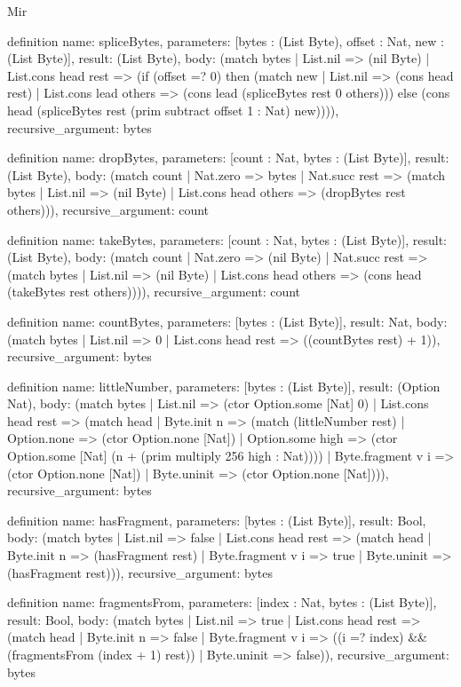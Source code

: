 \begin{lexlean}{Mir}
\begin{semanticmodule}
definition{
  name: spliceBytes,
  parameters: [bytes : (List Byte), offset : Nat, new : (List Byte)],
  result: (List Byte),
  body: (match bytes
    | List.nil => (nil Byte)
    | List.cons head rest => (if (offset =? 0) then (match new
      | List.nil => (cons head rest)
      | List.cons lead others => (cons lead (spliceBytes rest 0 others))) else (cons head (spliceBytes rest (prim subtract offset 1 : Nat) new)))),
  recursive_argument: bytes
}

definition{
  name: dropBytes,
  parameters: [count : Nat, bytes : (List Byte)],
  result: (List Byte),
  body: (match count
    | Nat.zero => bytes
    | Nat.succ rest => (match bytes
      | List.nil => (nil Byte)
      | List.cons head others => (dropBytes rest others))),
  recursive_argument: count
}

definition{
  name: takeBytes,
  parameters: [count : Nat, bytes : (List Byte)],
  result: (List Byte),
  body: (match count
    | Nat.zero => (nil Byte)
    | Nat.succ rest => (match bytes
      | List.nil => (nil Byte)
      | List.cons head others => (cons head (takeBytes rest others)))),
  recursive_argument: count
}

definition{
  name: countBytes,
  parameters: [bytes : (List Byte)],
  result: Nat,
  body: (match bytes | List.nil => 0 | List.cons head rest => ((countBytes rest) + 1)),
  recursive_argument: bytes
}

definition{
  name: littleNumber,
  parameters: [bytes : (List Byte)],
  result: (Option Nat),
  body: (match bytes
    | List.nil => (ctor Option.some [Nat] 0)
    | List.cons head rest => (match head
      | Byte.init n => (match (littleNumber rest)
        | Option.none => (ctor Option.none [Nat])
        | Option.some high => (ctor Option.some [Nat] (n + (prim multiply 256 high : Nat))))
      | Byte.fragment v i => (ctor Option.none [Nat])
      | Byte.uninit => (ctor Option.none [Nat]))),
  recursive_argument: bytes
}

definition{
  name: hasFragment,
  parameters: [bytes : (List Byte)],
  result: Bool,
  body: (match bytes
    | List.nil => false
    | List.cons head rest => (match head
      | Byte.init n => (hasFragment rest)
      | Byte.fragment v i => true
      | Byte.uninit => (hasFragment rest))),
  recursive_argument: bytes
}

definition{
  name: fragmentsFrom,
  parameters: [index : Nat, bytes : (List Byte)],
  result: Bool,
  body: (match bytes
    | List.nil => true
    | List.cons head rest => (match head
      | Byte.init n => false
      | Byte.fragment v i => ((i =? index) && (fragmentsFrom (index + 1) rest))
      | Byte.uninit => false)),
  recursive_argument: bytes
}


\end{semanticmodule}
\end{lexlean}
